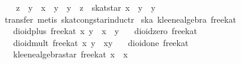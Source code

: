\begin{isabellebody}
\ \ \isamarkupfalse%
\ {}z\ {}\ y\ {}\ x\ {}\ y\ {}\ y\ {}\ z\ {}\ skat{}star\ x\ {}\ y\ {}\ y{}\isanewline
\ \ \ \ \isamarkupfalse%
\ {}transfer{}\ metis\ skat{}cong{}star{}inductr{}\isanewline
{}\isamarkupfalse%
%
\endisatagproof
{\isafoldproof}%
%
\isadelimproof
\isanewline
%
\endisadelimproof
\isanewline
\isanewline
\isanewline
{}\isamarkupfalse%
\ ska{}\ kleene{}algebra\ free{}kat\isanewline
\ \ \ {}dioid{}plus\ free{}kat\ x\ y\ {}\ x\ {}\ y{}\isanewline
\ \ \ {}dioid{}zero\ free{}kat\ {}\ {}{}\isanewline
\ \ \ {}dioid{}mult\ free{}kat\ x\ y\ {}\ x{}y{}\isanewline
\ \ \ {}dioid{}one\ free{}kat\ {}\ {}{}\isanewline
\ \ \ {}kleene{}algebra{}star\ free{}kat\ x\ {}\ x\isanewline

\end{isabellebody}
